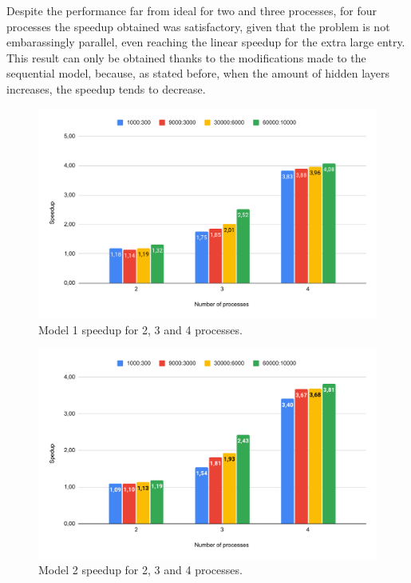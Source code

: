 \documentclass[conference]{IEEEtran}
\begin{document}
Despite the performance far from ideal for two and three processes, for four processes the speedup obtained was satisfactory, given that the problem is not embarassingly parallel, even reaching the linear speedup for the extra large entry. This result can only be obtained thanks to the modifications made to the sequential model, because, as stated before, when the amount of hidden layers increases, the speedup tends to decrease.

\begin{figure}
    \centering
    \includegraphics[width=\columnwidth]{images/speedup-model1.pdf}
    \caption{Model 1 speedup for 2, 3 and 4 processes.}
    \label{fig:speedup1}
\end{figure}

\begin{figure}
    \centering
    \includegraphics[width=\columnwidth]{images/speedup-model2.pdf}
    \caption{Model 2 speedup for 2, 3 and 4 processes.}
    \label{fig:speedup2}
\end{figure}
\end{document}
